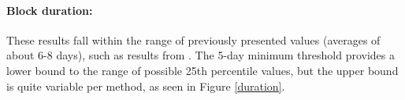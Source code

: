 \documentclass[smallextended]{svjour3}       %
\numberwithin{equation}{section}
\begin{document}



\paragraph{Block duration:} These results fall within the range of previously presented values (averages of about 6-8 days), such as results from \citealt{wiedenmann_climatology_2002}. The 5-day minimum threshold provides a lower bound to the range of possible 25th percentile values, but the upper bound is quite variable per method, as seen in Figure \ref{duration}. 
\end{document}
